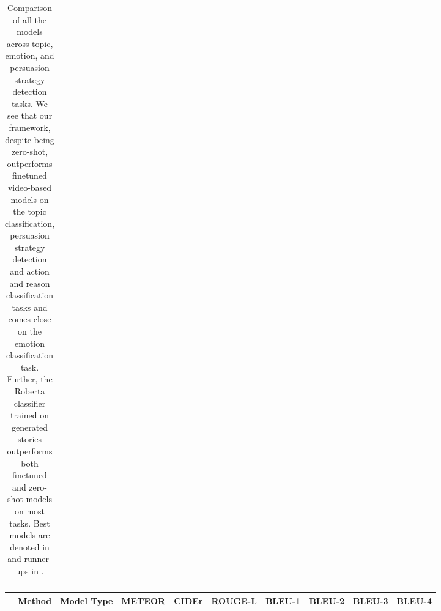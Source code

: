 \begin{table}[!h]
\begin{adjustbox}{width=\textwidth}
\begin{tabular}{llccccccc}
\bottomrule[1.5pt]
\end{tabular}
\end{adjustbox}
\caption{Comparison of all the models across topic, emotion, and persuasion strategy detection tasks. We see that our framework, despite being zero-shot, outperforms finetuned video-based models on the topic classification, persuasion strategy detection and action and reason classification tasks and comes close on the emotion classification task. Further, the Roberta classifier trained on generated stories outperforms both finetuned and zero-shot models on most tasks. Best models are denoted in  and runner-ups in .\label{tab:topic-sentiment}}
\end{table}



\begin{table}[!th]
  \centering
  \begin{adjustbox}{width=\textwidth}
  \begin{tabular}{cccccccccc}
    \toprule
    & Method & Model Type & METEOR & CIDEr & ROUGE-L & BLEU-1 & BLEU-2 & BLEU-3 & BLEU-4 \\
    \midrule
    

\end{tabular}
\end{adjustbox}
\end{table}
